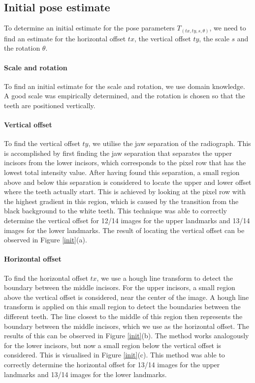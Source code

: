 \documentclass[a4paper,titlepage,12pt]{article}
\begin{document}
\subsection{Initial pose estimate}
\label{subsec:initial}

To determine an initial estimate for the pose parameters $T_{(tx,ty,s,\theta)}$, we need to find an estimate for the horizontal offset $tx$, the vertical offset $ty$, the scale $s$ and the rotation $\theta$.

\paragraph{Scale and rotation}

To find an initial estimate for the scale and rotation, we use domain knowledge. A good scale was empirically determined, and the rotation is chosen so that the teeth are positioned vertically.

\paragraph{Vertical offset}

To find the vertical offset $ty$, we utilise the jaw separation of the radiograph.
This is accomplished by first finding the jaw separation that separates the upper incisors from the lower incisors, which corresponds to the pixel row that has the lowest total intensity value. After having found this separation, a small region above and below this separation is considered to locate the upper and lower offset where the teeth actually start. This is achieved by looking at the pixel row with the highest gradient in this region, which is caused by the transition from the black background to the white teeth.
This technique was able to correctly determine the vertical offset for 12/14 images for the upper landmarks and 13/14 images for the lower landmarks.
The result of locating the vertical offset can be observed in Figure \ref{init}(a).

\paragraph{Horizontal offset}

To find the horizontal offset $tx$, we use a hough line transform to detect the boundary between the middle incisors.
For the upper incisors, a small region above the vertical offset is considered, near the center of the image.
A hough line transform is applied on this small region to detect the boundaries between the different teeth.
The line closest to the middle of this region then represents the boundary between the middle incisors, which we use as the horizontal offset.
The results of this can be observed in Figure \ref{init}(b).
The method works analogously for the lower incisors, but now a small region below the vertical offset is considered. 
This is visualised in Figure \ref{init}(c).
This method was able to correctly determine the horizontal offset for 13/14 images for the upper landmarks and 13/14 images for the lower landmarks.
\end{document}
